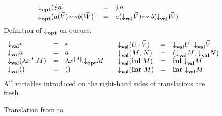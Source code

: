 \begin{figure*}
\begin{mdframed}
\begin{highlight}
\[\begin{array}{lcl}
        \\
        \atm{\parens{\gvZap{a}}}
        & = & \gvZap{a}
        \\
        \atm{\parens{\gvBuf{a}{\gvVec{V}}{b}{\gvVec{W}}}}
        & = & \gvBuf{a}{\atv{\gvVec{V}}}{b}{\atv{\gvVec{W}}}
      \end{array}
    \]
    Definition of $\relax{{\downarrow}_{\mathbf{opt}}}\relax{}$ on queues:%
    \[
      \begin{array}{lcl}
        \atv{\gvVecEmp}
        & = & \gvVecEmp
        \\
        \atv{\tm{a}}
        & = & \tm{a}
        \\
        \atv{\parens{\gvAbs[A]{x}{M}}}
        & = & \gvAbs[\ftm{A}]{x}{\atm{M}}
        \\
        \atv{\gvUnit}
        & = & \gvUnit
      \end{array}
      \quad
      \begin{array}{lcl}
        \atv{\parens{U\gvVecAdd\gvVec{V}}}
        & = & \atv{U}\gvVecAdd\atv{\gvVec{V}}
        \\
        \atv{\gvPair{M}{N}}
        & = & \gvPair{\atv{M}}{\atv{N}}
        \\
        \atv{\parens{\gvInl{M}}}
        & = & \gvInl{\atv{M}}
        \\
        \atv{\parens{\gvInr{M}}}
        & = & \gvInr{\atv{M}}
      \end{array}
    \]
    All variables introduced on the right-hand sides of translations are fresh.
  \end{highlight}\end{mdframed}
  \caption{Translation from \affineEGV to \affineAGV.}
  \label{fig:affine-egv-to-agv}
\end{figure*}

